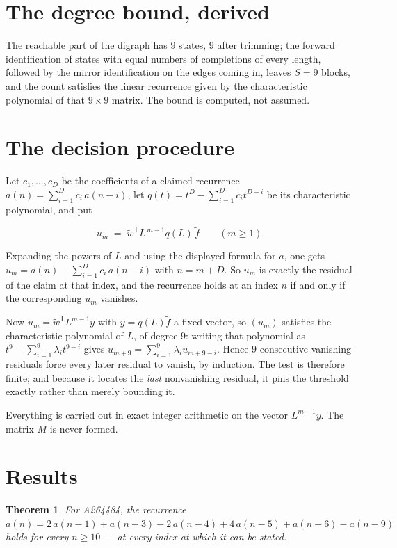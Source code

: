 \documentclass[11pt]{article}
\newtheorem{theorem}{Theorem}
\theoremstyle{definition}
\begin{document}
\section{The degree bound, derived}

The reachable part of the digraph has $9$ states, $9$ after trimming; the forward identification of states with equal numbers of completions of every length, followed by the mirror identification on the edges coming in, leaves $S = 9$ blocks, and the count satisfies the linear recurrence given by the characteristic polynomial of that $9\times9$ matrix. The bound is computed, not assumed.

\section{The decision procedure}

Let $c_1,\dots,c_D$ be the coefficients of a claimed recurrence $a(n) = \sum_{i=1}^{D} c_i\,a(n-i)$, let $q(t) = t^{D} - \sum_{i=1}^{D} c_i t^{D-i}$ be its characteristic polynomial, and put

\[u_m \;=\; \tilde w^{\mathsf T} L^{\,m-1} q(L)\,\tilde f \qquad (m \ge 1).\]

Expanding the powers of $L$ and using the displayed formula for $a$, one gets $u_m = a(n) - \sum_{i=1}^{D} c_i\,a(n-i)$ with $n = m + D$. So $u_m$ is exactly the residual of the claim at that index, and the recurrence holds at an index $n$ if and only if the corresponding $u_m$ vanishes.

Now $u_m = \tilde w^{\mathsf T} L^{m-1} y$ with $y = q(L)\tilde f$ a fixed vector, so $(u_m)$ satisfies the characteristic polynomial of $L$, of degree $9$: writing that polynomial as $t^{9} - \sum_{i=1}^{9} \lambda_i t^{9-i}$ gives $u_{m+9} = \sum_{i=1}^{9} \lambda_i u_{m+9-i}$. Hence $9$ consecutive vanishing residuals force every later residual to vanish, by induction. The test is therefore finite; and because it locates the {\itshape last} nonvanishing residual, it pins the threshold exactly rather than merely bounding it.

Everything is carried out in exact integer arithmetic on the vector $L^{m-1}y$. The matrix $M$ is never formed.

\section{Results}

\begin{theorem} For A264484, the recurrence $a(n) = 2\,a(n-1) + a(n-3) - 2\,a(n-4) + 4\,a(n-5) + a(n-6) - a(n-9)$ holds for every $n \ge 10$ --- at every index at which it can be stated.\end{theorem}
\end{document}

